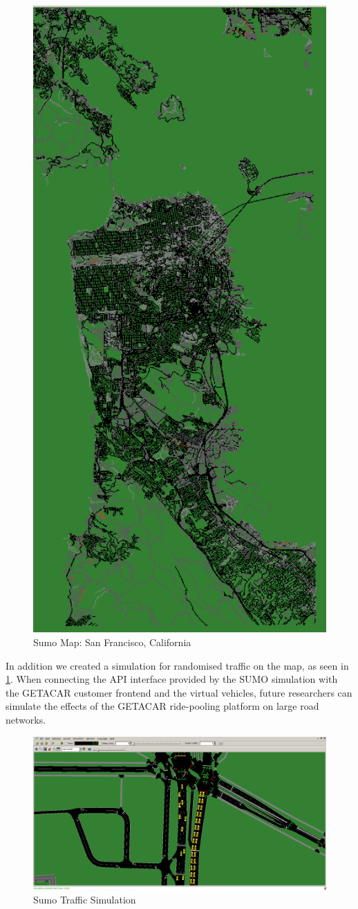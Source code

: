 \begin{figure}[h]
    \centering
    \includegraphics[width=0.40\linewidth]{data/ffss/sumo2.png}
    \caption{Sumo Map: San Francisco, California}
    \label{fig:Sumo2}
\end{figure}



In addition we created a simulation for randomised traffic on the map, as seen in \ref{fig:Sumo2}. When connecting the API interface provided by the SUMO simulation with the GETACAR customer frontend and the virtual vehicles, future researchers can simulate the effects of the GETACAR ride-pooling platform on large road networks.

\begin{figure}[h]
    \centering
    \includegraphics[width=0.90\linewidth]{data/ffss/sumo1.png}
    \caption{Sumo Traffic Simulation}
    \label{fig:Sumo1}
\end{figure}






